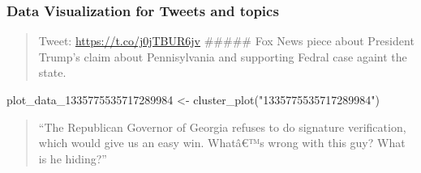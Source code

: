 \documentclass[
]{article}
\newenvironment{Shaded}{\begin{snugshade}}{\end{snugshade}}
\newcommand{\AttributeTok}[1]{\textcolor[rgb]{0.77,0.63,0.00}{#1}}
\newcommand{\FunctionTok}[1]{\textcolor[rgb]{0.00,0.00,0.00}{#1}}
\newcommand{\NormalTok}[1]{#1}
\newcommand{\OtherTok}[1]{\textcolor[rgb]{0.56,0.35,0.01}{#1}}
\newcommand{\SpecialCharTok}[1]{\textcolor[rgb]{0.00,0.00,0.00}{#1}}
\newcommand{\StringTok}[1]{\textcolor[rgb]{0.31,0.60,0.02}{#1}}
\begin{document}
\hypertarget{data-visualization-for-tweets-and-topics}{%
\subsubsection{Data Visualization for Tweets and
topics}\label{data-visualization-for-tweets-and-topics}}

\begin{quote}
Tweet: \url{https://t.co/j0jTBUR6jv} \#\#\#\#\# Fox News piece about
President Trump's claim about Pennisylvania and supporting Fedral case
againt the state.
\end{quote}

\begin{Shaded}
\begin{Highlighting}[]
\NormalTok{plot\_data\_1335775535717289984 }\OtherTok{\textless{}{-}} \FunctionTok{cluster\_plot}\NormalTok{(}\StringTok{"1335775535717289984"}\NormalTok{)}
\end{Highlighting}
\end{Shaded}

\begin{Shaded}
\end{Shaded}

\begin{quote}
``The Republican Governor of Georgia refuses to do signature
verification, which would give us an easy win. Whatâ€™s wrong with this
guy? What is he hiding?''
\end{quote}
\end{document}
